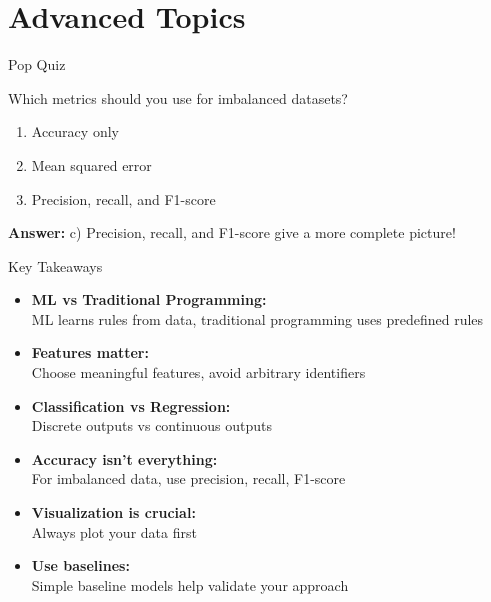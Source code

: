\documentclass[dvipsnames]{beamer}
\begin{document}
\section{Advanced Topics}

\begin{frame}{Pop Quiz}
\begin{popquizbox}{1}
Which metrics should you use for imbalanced datasets?
\begin{enumerate}
\item Accuracy only  
\item Mean squared error
\item Precision, recall, and F1-score
\end{enumerate}

\vspace{0.5em}
\textbf{Answer:} c) Precision, recall, and F1-score give a more complete picture!
\end{popquizbox}
\end{frame}

\begin{frame}{Key Takeaways}
\begin{itemize}
\item \textbf{ML vs Traditional Programming:} \\
      ML learns rules from data, traditional programming uses predefined rules
	\pause
\item \textbf{Features matter:} \\
      Choose meaningful features, avoid arbitrary identifiers
	\pause
\item \textbf{Classification vs Regression:} \\
      Discrete outputs vs continuous outputs
	\pause
\item \textbf{Accuracy isn't everything:} \\
      For imbalanced data, use precision, recall, F1-score
	\pause
\item \textbf{Visualization is crucial:} \\
      Always plot your data first
	\pause
\item \textbf{Use baselines:} \\
      Simple baseline models help validate your approach
\end{itemize}
\end{frame}
\end{document}
